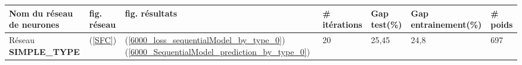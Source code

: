 \begin{table}[H]
	\begin{center}
	\begin{tabular}{|m{4.5cm}|m{2cm}|m{2.5cm}|m{1.9cm}|m{1.5cm}|m{1.5cm}|m{1.5cm}|}
	\hline
	\rowcolor{cyan}Nom du réseau de neurones &fig. réseau&fig. résultats &\# itérations& Gap test(\%)&Gap entrainement(\%)& \# poids\\
	\hline
	Réseau \textbf{SIMPLE\_TYPE} & (\ref{SFC})& (\ref{6000_loss_sequentialModel_by_type_0}) (\ref{6000_SequentialModel_prediction_by_type_0}) &20&25,45&24,8 &697\\

\end{tabular}
\end{center}
\end{table}
